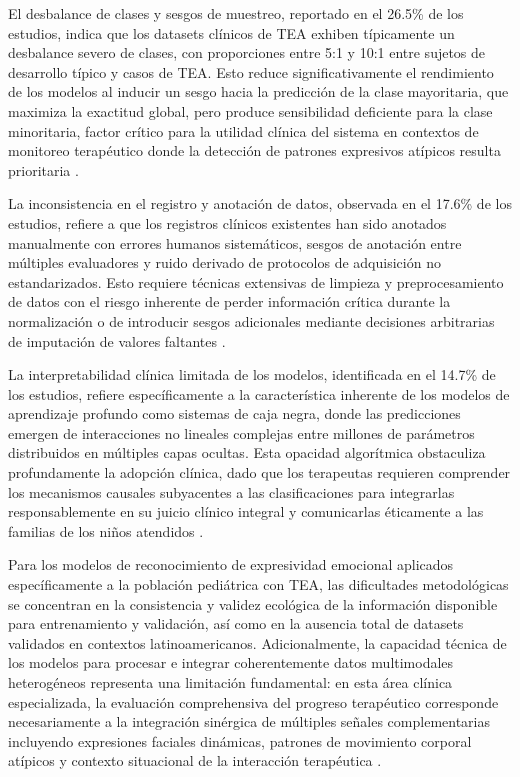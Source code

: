 \documentclass[3p,twocolumn,times]{elsarticle}
\begin{document}
	El desbalance de clases y sesgos de muestreo, reportado en el 26.5\% de los
	estudios, indica que los datasets clínicos de TEA exhiben típicamente un desbalance
	severo de clases, con proporciones entre 5:1 y 10:1 entre sujetos de desarrollo
	típico y casos de TEA. Esto reduce significativamente el rendimiento de los modelos
	al inducir un sesgo hacia la predicción de la clase mayoritaria, que maximiza la
	exactitud global, pero produce sensibilidad deficiente para la clase minoritaria,
	factor crítico para la utilidad clínica del sistema en contextos de monitoreo
	terapéutico donde la detección de patrones expresivos atípicos resulta prioritaria
	\cite{Alam2025,Hosney2024}.
	
	La inconsistencia en el registro y anotación de datos, observada en el 17.6\% de
	los estudios, refiere a que los registros clínicos existentes han sido anotados
	manualmente con errores humanos sistemáticos, sesgos de anotación entre múltiples
	evaluadores y ruido derivado de protocolos de adquisición no estandarizados. Esto
	requiere técnicas extensivas de limpieza y preprocesamiento de datos con el riesgo
	inherente de perder información crítica durante la normalización o de introducir
	sesgos adicionales mediante decisiones arbitrarias de imputación de valores
	faltantes \cite{Sariyanidi2025,Dapogny2019}.
	
	La interpretabilidad clínica limitada de los modelos, identificada en el 14.7\% de
	los estudios, refiere específicamente a la característica inherente de los modelos
	de aprendizaje profundo como sistemas de caja negra, donde las predicciones emergen
	de interacciones no lineales complejas entre millones de parámetros distribuidos en
	múltiples capas ocultas. Esta opacidad algorítmica obstaculiza profundamente la
	adopción clínica, dado que los terapeutas requieren comprender los mecanismos
	causales subyacentes a las clasificaciones para integrarlas responsablemente en su
	juicio clínico integral y comunicarlas éticamente a las familias de los niños
	atendidos \cite{Rhatassi2024,Radocaj2025}.
	
	Para los modelos de reconocimiento de expresividad emocional aplicados
	específicamente a la población pediátrica con TEA, las dificultades metodológicas
	se concentran en la consistencia y validez ecológica de la información disponible
	para entrenamiento y validación, así como en la ausencia total de datasets
	validados en contextos latinoamericanos. Adicionalmente, la capacidad técnica de
	los modelos para procesar e integrar coherentemente datos multimodales heterogéneos
	representa una limitación fundamental: en esta área clínica especializada, la
	evaluación comprehensiva del progreso terapéutico corresponde necesariamente a la
	integración sinérgica de múltiples señales complementarias incluyendo expresiones
	faciales dinámicas, patrones de movimiento corporal atípicos y contexto situacional
	de la interacción terapéutica \cite{Rudovic2019,Cicceri2026}.
	
\end{document}
